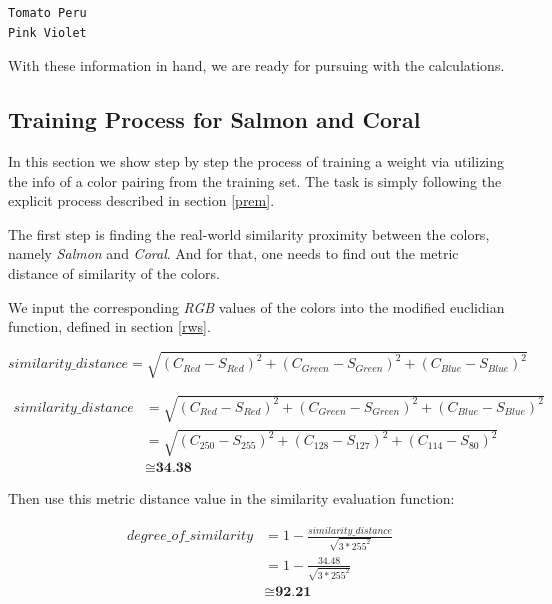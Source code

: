 \documentclass[egilmezThesis.tex]{subfiles}
\begin{document}
\lstset{language=C++,basicstyle=\footnotesize}
\begin{lstlisting}[caption=The training set, breaklines=true]
Tomato Peru
Pink Violet
\end{lstlisting}


With these  information in hand, we are ready for pursuing with the calculations.

\subsection{Training Process for Salmon and Coral}
\label{sc}

In this section we show step by step the process of training a weight via utilizing the info of a color pairing from the training set. The task is simply following the explicit process described in section \ref{prem}.

The first step is finding the real-world similarity proximity between the colors, namely \textit{Salmon} and \textit{Coral}. And for that, one needs to find out the metric distance of similarity of the colors.

We input the corresponding \textit{RGB} values of the colors into the modified euclidian function, defined in section \ref{rws}.

$$similarity\_distance=\sqrt{(C_{Red}-S_{Red})^2+(C_{Green}-S_{Green})^2+(C_{Blue}-S_{Blue})^2}$$

\begin{equation}
\begin{split}
similarity\_distance &= \sqrt{(C_{Red}-S_{Red})^2+(C_{Green}-S_{Green})^2+(C_{Blue}-S_{Blue})^2}\\
&= \sqrt{(C_{250}-S_{255})^2+(C_{128}-S_{127})^2+(C_{114}-S_{80})^2}\\
&\cong{\textbf{34.38}}
\end{split} 
\end{equation}

Then use this metric distance value in the similarity evaluation function:

\begin{equation}
\begin{split}
degree\_of\_similarity &= 1 - \frac{similarity\_distance}{\sqrt{3*255^2}}\\
&= 1 - \frac{34.48}{\sqrt{3*255^2}}\\
&\cong{\textbf{92.21}}
\end{split} 
\end{equation}
\end{document}
